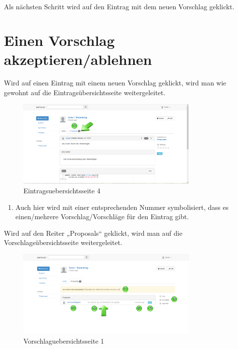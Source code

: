 Als nächsten Schritt wird auf den Eintrag mit dem neuen Vorschlag geklickt.


\section{Einen Vorschlag akzeptieren/ablehnen}

Wird auf einen Eintrag mit einem neuen Vorschlag geklickt, wird man wie gewohnt auf die Eintragsübersichtsseite weitergeleitet.

\begin{figure}[H]
    \centering
    \includegraphics[width=0.8\textwidth]{Bilder/34.png}
    \caption{Eintragsuebersichtsseite 4}
    \label{fig:eintragsuebersichtsseite4}
\end{figure}


\begin{enumerate}
\item Auch hier wird mit einer entsprechenden Nummer symbolisiert, dass es einen/mehrere Vorschlag/Vorschläge für den Eintrag gibt.
\end{enumerate}


Wird auf den Reiter „Proposals“ geklickt, wird man auf die Vorschlagsübersichtsseite weitergeleitet.


\begin{figure}[H]
    \centering
    \includegraphics[width=0.8\textwidth]{Bilder/35.png}
    \caption{Vorschlaguebersichtsseite 1}
    \label{fig:vorschlaguebersichtsseite1}
\end{figure}



